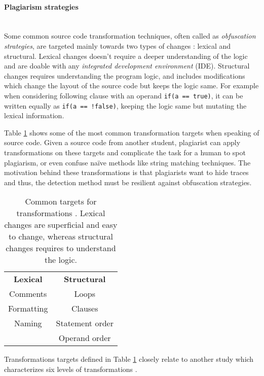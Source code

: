 \paragraph{Plagiarism strategies}\mbox{}\\
Some common source code transformation techniques, often called as \emph{obfuscation strategies}, are targeted mainly towards two types of changes \cite{PlagInProg1999}: lexical and structural. Lexical changes doesn't require a deeper understanding of the logic and are doable with any \emph{integrated development environment} (IDE). Structural changes requires  understanding the program logic, and includes modifications which change the layout of the source code but keeps the logic same. For example when considering following clause with an operand \texttt{if(a == true)}, it can be written equally as \texttt{if(a == !false)}, keeping the logic same but mutating the lexical information.

Table \ref{tbl-plag-strat} shows some of the most common transformation targets when speaking of source code. Given a source code from another student, plagiarist can apply transformations on these targets and complicate the task for a human to spot plagiarism, or even confuse naïve methods like string matching techniques. The motivation behind these transformations is that plagiarists want to hide traces and thus, the detection method must be resilient against obfuscation strategies.

\newpage

\begin{table}[ht]
\centering
\caption{Common targets for transformations \cite{PlagInProg1999}. Lexical changes are superficial and easy to change, whereas structural changes requires to understand the logic.}
\label{tbl-plag-strat}
\begin{tabular}{|c|c|} \hline
 \textbf{Lexical} & \textbf{Structural} \\ \hhline{|=|=|}
 Comments                    & Loops                          \\
 Formatting                  & Clauses                        \\
 Naming                      & Statement order                \\
                             & Operand order               \\ \hline
\end{tabular}
\end{table}


\noindent
Transformations targets defined in Table \ref{tbl-plag-strat} closely relate to another study which characterizes six levels of transformations \cite{Faidhi:1987:EAD:27319.27321}.

